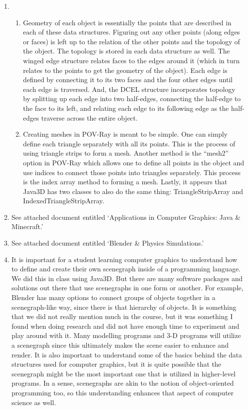 \documentclass[11pt]{article}
\begin{document}
\begin{enumerate}
  \item
    \begin{enumerate}
      \item Geometry of each object is essentially the points that are described in each of these data structures. Figuring out any other points (along edges or faces) is left up to the relation of the other points and the topology of the object. The topology is stored in each data structure as well. The winged edge structure relates faces to the edges around it (which in turn relates to the points to get the geometry of the object). Each edge is defined by connecting it to its two faces and the four other edges until each edge is traversed. And, the DCEL structure incorporates topology by splitting up each edge into two half-edges, connecting the half-edge to the face to its left, and relating each edge to its following edge as the half-edges traverse across the entire object.
      \item Creating meshes in POV-Ray is meant to be simple. One can simply define each triangle separately with all its points. This is the process of using triangle strips to form a mesh. Another method is the ``mesh2'' option in POV-Ray which allows one to define all points in the object and use indices to connect those points into triangles separately. This process is the index array method to forming a mesh. Lastly, it appears that Java3D has two classes to also do the same thing: TriangleStripArray and IndexedTriangleStripArray.
    \end{enumerate}

  \item See attached document entitled `Applications in Computer Graphics: Java \& Minecraft.'

  \item See attached document entitled `Blender \& Physics Simulations.'

  \item It is important for a student learning computer graphics to understand how to define and create their own scenegraph inside of a programming language. We did this in class using Java3D. But there are many software packages and solutions out there that use scenegraphs in one form or another. For example, Blender has many options to connect groups of objects together in a scenegraph-like way, since there is that hierarchy of objects. It is something that we did not really mention much in the course, but it was something I found when doing research and did not have enough time to experiment and play around with it. Many modelling programs and 3-D programs will utilize a scenegraph since this ultimately makes the scene easier to enhance and render. It is also important to understand some of the basics behind the data structures used for computer graphics, but it is quite possible that the scenegraph might be the most important one that is utilized in higher-level programs. In a sense, scenegraphs are akin to the notion of object-oriented programming too, so this understanding enhances that aspect of computer science as well.

\end{enumerate}
\end{document}
